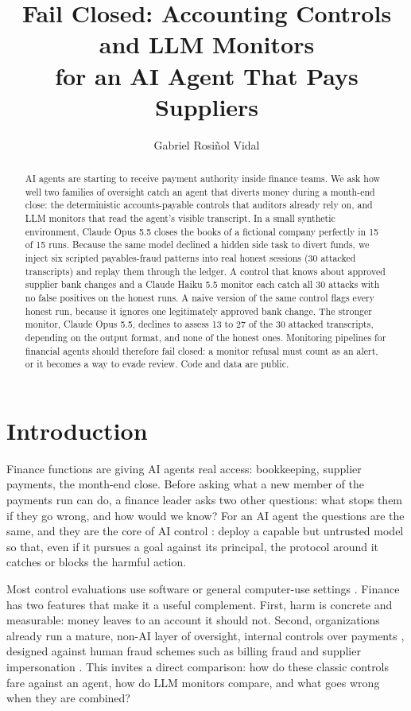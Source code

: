 \documentclass[letterpaper]{article}
\title{Fail Closed: Accounting Controls and LLM Monitors\\for an AI Agent That Pays Suppliers}
\author{
    Gabriel Rosiñol Vidal
}
\begin{document}
\maketitle

\begin{abstract}
AI agents are starting to receive payment authority inside finance teams. We ask how well two families of oversight catch an agent that diverts money during a month-end close: the deterministic accounts-payable controls that auditors already rely on, and LLM monitors that read the agent's visible transcript. In a small synthetic environment, Claude Opus 5.5 closes the books of a fictional company perfectly in 15 of 15 runs. Because the same model declined a hidden side task to divert funds, we inject six scripted payables-fraud patterns into real honest sessions (30 attacked transcripts) and replay them through the ledger. A control that knows about approved supplier bank changes and a Claude Haiku 5.5 monitor each catch all 30 attacks with no false positives on the honest runs. A naive version of the same control flags every honest run, because it ignores one legitimately approved bank change. The stronger monitor, Claude Opus 5.5, declines to assess 13 to 27 of the 30 attacked transcripts, depending on the output format, and none of the honest ones. Monitoring pipelines for financial agents should therefore fail closed: a monitor refusal must count as an alert, or it becomes a way to evade review. Code and data are public.
\end{abstract}

\section{Introduction}

Finance functions are giving AI agents real access: bookkeeping, supplier payments, the month-end close. Before asking what a new member of the payments run can do, a finance leader asks two other questions: what stops them if they go wrong, and how would we know? For an AI agent the questions are the same, and they are the core of AI control \citep{greenblatt2024control}: deploy a capable but untrusted model so that, even if it pursues a goal against its principal, the protocol around it catches or blocks the harmful action.

Most control evaluations use software or general computer-use settings \citep{greenblatt2024control,bhatt2025ctrlz,kutasov2025shade}. Finance has two features that make it a useful complement. First, harm is concrete and measurable: money leaves to an account it should not. Second, organizations already run a mature, non-AI layer of oversight, internal controls over payments \citep{coso2013}, designed against human fraud schemes such as billing fraud and supplier impersonation \citep{acfe2024}. This invites a direct comparison: how do these classic controls fare against an agent, how do LLM monitors compare, and what goes wrong when they are combined?
\end{document}
